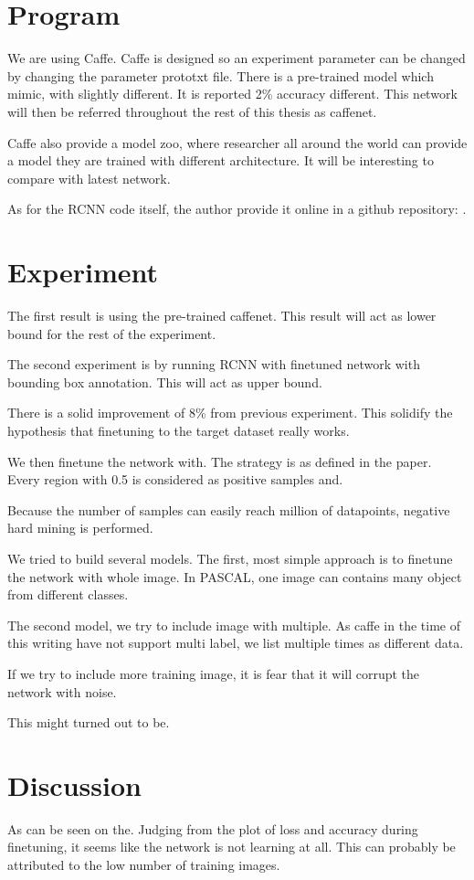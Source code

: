 \documentclass[a4paper,11pt]{kth-mag}
\begin{document}
\section{Program}
We are using Caffe.
Caffe is designed so an experiment parameter can be changed by changing the parameter prototxt file.
There is a pre-trained model which mimic, with slightly different. It is reported 2\% accuracy different. This network will then be referred throughout the rest of this thesis as caffenet.

Caffe also provide a model zoo, where researcher all around the world can provide a model they are trained with different architecture. It will be interesting to compare with latest network.

As for the RCNN code itself, the author provide it online in a github repository: .

\section{Experiment}

The first result is using the pre-trained caffenet. This result will act as lower bound for the rest of the experiment.

The second experiment is by running RCNN with finetuned network with bounding box annotation. This will act as upper bound.

There is a solid improvement of 8\% from previous experiment. This solidify the hypothesis that finetuning to the target dataset really works.

We then finetune the network with. The strategy is as defined in the paper. Every region with 0.5 is considered as positive samples and.

Because the number of samples can easily reach million of datapoints, negative hard mining is performed.

We tried to build several models. The first, most simple approach is to finetune the network with whole image. In PASCAL, one image can contains many object from different classes.

The second model, we try to include image with multiple. As caffe in the time of this writing have not support multi label, we list multiple times as different data.

If we try to include more training image, it is fear that it will corrupt the network with noise.

This might turned out to be.

\section{Discussion}
As can be seen on the. Judging from the plot of loss and accuracy during finetuning, it seems like the network is not learning at all.
This can probably be attributed to the low number of training images.
\end{document}
